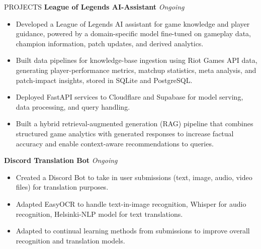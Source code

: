 \documentclass{resume} %
\begin{document}
\begin{rSection}{PROJECTS}
\vspace{-6pt}
\textbf{League of Legends AI-Assistant} \hfill {\em Ongoing} \\
\begin{itemize}
    \vspace{-2em}
    \itemsep -6pt {}
    \item Developed a League of Legends AI assistant for game knowledge and player guidance, powered by a domain-specific model fine-tuned on gameplay data, champion information, patch updates, and derived analytics.
    \item Built data pipelines for knowledge-base ingestion using Riot Games API data, generating player-performance metrics, matchup statistics, meta analysis, and patch-impact insights, stored in SQLite and PostgreSQL.
    \item Deployed FastAPI services to Cloudflare and Supabase for model serving, data processing, and query handling.
    \item Built a hybrid retrieval-augmented generation (RAG) pipeline that combines structured game analytics with generated responses to increase factual accuracy and enable context-aware recommendations to queries.
\end{itemize}
\vspace{-6pt}
\textbf{Discord Translation Bot} \hfill {\em Ongoing} \\
\begin{itemize}
    \vspace{-2em}
    \itemsep -6pt {}
    \item Created a Discord Bot to take in user submissions (text, image, audio, video files) for translation purposes.
    \item Adapted EasyOCR to handle text-in-image recognition, Whisper for audio recognition, Helsinki-NLP model for text translations.
    \item Adapted to continual learning methods  from submissions to improve overall recognition and translation models.

\end{itemize}
\end{rSection}
\end{document}
